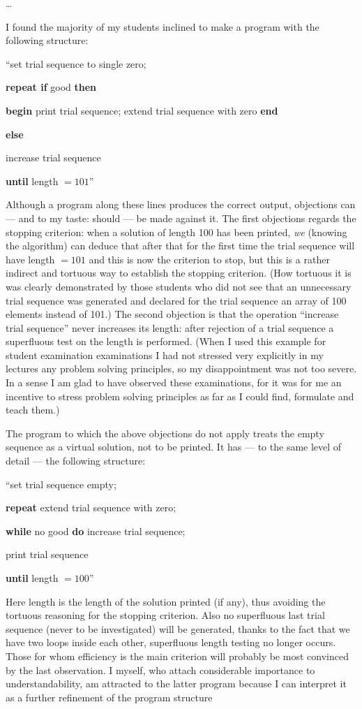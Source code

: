 \dots

I found the majority of my students inclined to make a program with the following structure:

``set trial sequence to single zero;

\textbf{repeat if} good \textbf{then}

\quad \textbf{begin} print trial sequence; extend trial sequence with zero \textbf{end}

\quad\quad\quad \textbf{else}

\quad increase trial sequence

\textbf{until} length $= 101$''

Although a program along these lines produces the correct output, objections can --- and to my taste: should --- be made against it. The first objections regards the stopping criterion: when a solution of length 100 has been printed, \textit{we} (knowing the algorithm) can deduce that after that for the first time the trial sequence will have length $= 101$ and this is now the criterion to stop, but this is a rather indirect and tortuous way to establish the stopping criterion. (How tortuous it is was clearly demonstrated by those students who did not see that an unnecessary trial sequence was generated and declared for the trial sequence an array of 100 elements instead of 101.) The second objection is that the operation ``increase trial sequence'' never increases its length: after rejection of a trial sequence a superfluous test on the length is performed. (When I used this example for student examination examinations I had not stressed very explicitly in my lectures any problem solving principles, so my disappointment was not too severe. In a sense I am glad to have observed these examinations, for it was for me an incentive to stress problem solving principles as far as I could find, formulate and teach them.)

The program to which the above objections do not apply treats the empty sequence as a virtual solution, not to be printed. It has --- to the same level of detail --- the following structure:

``set trial sequence empty;

\textbf{repeat} extend trial sequence with zero;

\quad \textbf{while} no good \textbf{do} increase trial sequence;

\quad print trial sequence

\textbf{until} length $= 100$''

Here length is the length of the solution printed (if any), thus avoiding the tortuous reasoning for the stopping criterion. Also no superfluous last trial sequence (never to be investigated) will be generated, thanks to the fact that we have two loops inside each other, superfluous length testing no longer occurs. Those for whom efficiency is the main criterion will probably be most convinced by the last observation. I myself, who attach considerable importance to understandability, am attracted to the latter program because I can interpret it as a further refinement of the program structure

